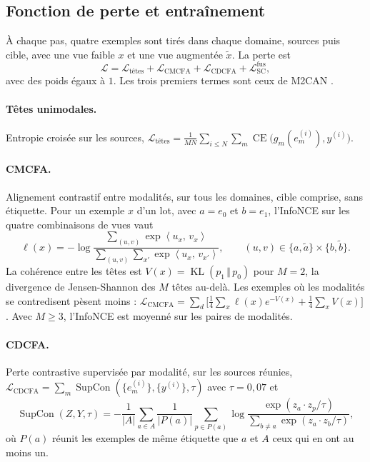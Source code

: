 \documentclass[11pt,a4paper]{article}
\theoremstyle{definition}
\theoremstyle{remark}
\newcommand{\ip}[2]{\left\langle #1,\, #2 \right\rangle}
\newcommand{\abs}[1]{\left\lvert #1 \right\rvert}
\DeclareMathOperator{\CE}{CE}
\DeclareMathOperator{\KL}{KL}
\DeclareMathOperator{\SupCon}{SupCon}
\newcommand{\Loss}{\mathcal{L}}
\begin{document}
\subsection{Fonction de perte et entraînement}\label{sec-perte}

À chaque pas, quatre exemples sont tirés dans chaque domaine, sources puis cible, avec une vue faible $x$ et une vue
augmentée $\tilde x$. La perte est
\begin{equation}\label{eq-perte}
  \Loss = \Loss_{\text{têtes}} + \Loss_{\text{CMCFA}} + \Loss_{\text{CDCFA}} + \Loss^{\text{fus}}_{\text{SC}},
\end{equation}
avec des poids égaux à $1$. Les trois premiers termes sont ceux de M2CAN \citep{zhao2025msmmda}.

\paragraph{Têtes unimodales.} Entropie croisée sur les sources,
$\Loss_{\text{têtes}} = \frac{1}{MN} \sum_{i \le N} \sum_m \CE\bigl(g_m(e^{(i)}_m), y^{(i)}\bigr)$.

\paragraph{CMCFA.} Alignement contrastif entre modalités, sur tous les domaines, cible comprise, sans étiquette. Pour un
exemple $x$ d'un lot, avec $a = e_0$ et $b = e_1$, l'InfoNCE sur les quatre combinaisons de vues vaut
\begin{equation}\label{eq-infonce}
  \ell(x) = -\log \frac{\sum_{(u, v)} \exp\ip{u_x}{v_x}}{\sum_{(u, v)} \sum_{x'} \exp\ip{u_x}{v_{x'}}},
  \qquad (u, v) \in \{a, \tilde a\} \times \{b, \tilde b\}.
\end{equation}
La cohérence entre les têtes est $V(x) = \KL(p_1 \,\Vert\, p_0)$ pour $M = 2$, la divergence de Jensen-Shannon des $M$
têtes au-delà. Les exemples où les modalités se contredisent pèsent moins :
$\Loss_{\text{CMCFA}} = \sum_{d} \bigl[\tfrac14 \sum_{x} \ell(x) e^{-V(x)} + \tfrac14 \sum_{x} V(x)\bigr]$. Avec
$M \ge 3$, l'InfoNCE est moyenné sur les paires de modalités.

\paragraph{CDCFA.} Perte contrastive supervisée \citep{khosla2020supcon} par modalité, sur les sources réunies,
$\Loss_{\text{CDCFA}} = \sum_m \SupCon(\{e^{(i)}_m\}, \{y^{(i)}\}, \tau)$ avec $\tau = 0{,}07$ et
\begin{equation}\label{eq-supcon}
  \SupCon(Z, Y, \tau) = -\frac{1}{\abs{A}} \sum_{a \in A} \frac{1}{\abs{P(a)}} \sum_{p \in P(a)}
  \log \frac{\exp(z_a \cdot z_p / \tau)}{\sum_{b \ne a} \exp(z_a \cdot z_b / \tau)},
\end{equation}
où $P(a)$ réunit les exemples de même étiquette que $a$ et $A$ ceux qui en ont au moins un.
\end{document}
